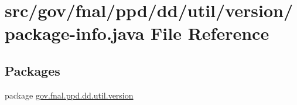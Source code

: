 \hypertarget{gov_2fnal_2ppd_2dd_2util_2version_2package-info_8java}{\section{src/gov/fnal/ppd/dd/util/version/package-\/info.java File Reference}
\label{gov_2fnal_2ppd_2dd_2util_2version_2package-info_8java}
}
\subsection*{Packages}
\begin{DoxyCompactItemize}
\item 
package \hyperlink{namespacegov_1_1fnal_1_1ppd_1_1dd_1_1util_1_1version}{gov.\-fnal.\-ppd.\-dd.\-util.\-version}
\end{DoxyCompactItemize}
